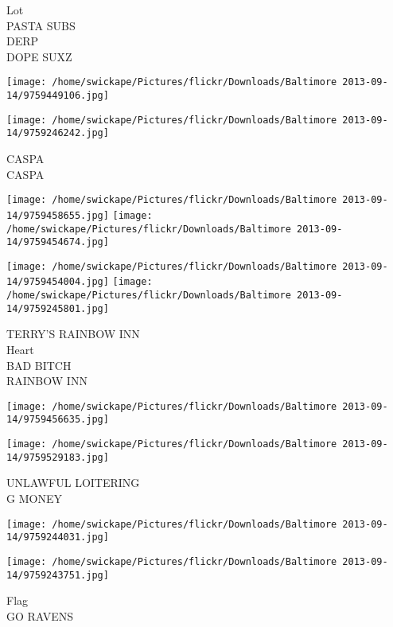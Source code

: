 \documentclass[10pt,letterpaper]{article}
\begin{document}
Lot\\
PASTA SUBS\\
DERP\\
DOPE SUXZ\\
\pagebreak

\texttt{[image: /home/swickape/Pictures/flickr/Downloads/Baltimore 2013-09-14/9759449106.jpg]}

\vspace{0.25in}
\texttt{[image: /home/swickape/Pictures/flickr/Downloads/Baltimore 2013-09-14/9759246242.jpg]}

CASPA\\
CASPA\\
\pagebreak

\texttt{[image: /home/swickape/Pictures/flickr/Downloads/Baltimore 2013-09-14/9759458655.jpg]}
\texttt{[image: /home/swickape/Pictures/flickr/Downloads/Baltimore 2013-09-14/9759454674.jpg]}

\texttt{[image: /home/swickape/Pictures/flickr/Downloads/Baltimore 2013-09-14/9759454004.jpg]}
\texttt{[image: /home/swickape/Pictures/flickr/Downloads/Baltimore 2013-09-14/9759245801.jpg]}

TERRY'S RAINBOW INN\\
Heart\\
BAD BITCH\\
RAINBOW INN\\
\pagebreak

\texttt{[image: /home/swickape/Pictures/flickr/Downloads/Baltimore 2013-09-14/9759456635.jpg]}

\vspace{0.25in}
\texttt{[image: /home/swickape/Pictures/flickr/Downloads/Baltimore 2013-09-14/9759529183.jpg]}

UNLAWFUL LOITERING\\
G MONEY\\
\pagebreak

\texttt{[image: /home/swickape/Pictures/flickr/Downloads/Baltimore 2013-09-14/9759244031.jpg]}

\vspace{0.25in}
\texttt{[image: /home/swickape/Pictures/flickr/Downloads/Baltimore 2013-09-14/9759243751.jpg]}

Flag\\
GO RAVENS\\
\pagebreak
\end{document}
